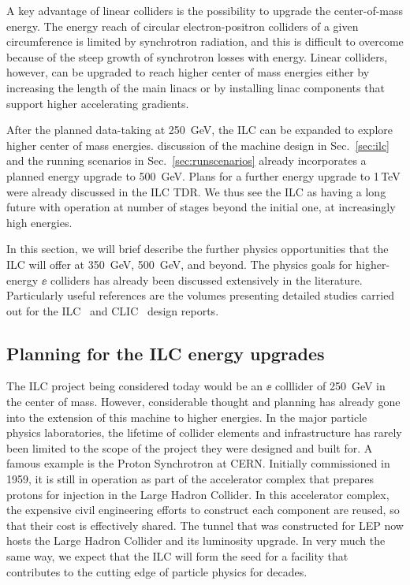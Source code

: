 


A key advantage of linear colliders is the possibility to upgrade
the center-of-mass energy.  The energy reach of circular electron-positron
colliders of a given circumference is limited by synchrotron
radiation, and this is difficult to overcome because of the steep
growth of synchrotron losses with energy.  Linear colliders, however,
can be upgraded to reach higher center of mass energies either by
increasing the length of the main linacs or by installing linac components
that support higher accelerating gradients.  

After the planned data-taking at 250~GeV, the ILC can
be expanded to explore higher center of mass energies.
discussion of the machine design in Sec.~\ref{sec:ilc} and the 
running scenarios in Sec.~\ref{sec:runscenarios} already incorporates a 
planned energy upgrade to 500~GeV.  Plans for a further energy upgrade
to 1\,TeV were already discussed in the ILC TDR.
  We thus see the ILC as having a long
future with operation at number of stages beyond the initial one, at
increasingly high energies. 

In this section, we will brief describe the further physics
opportunities that the ILC will offer at 350~GeV, 500~GeV, and beyond.
The physics goals for higher-energy $\ee$ colliders has already been 
discussed extensively in the literature. Particularly useful
references are the volumes presenting  detailed studies carried out for 
the ILC~\cite{Fujii:2015jha,Baer:2013cma}
and CLIC~\cite{Linssen:2012hp,deBlas:2018mhx,Roloff:2018dqu} design reports. 




\subsection{Planning for the ILC energy upgrades}
\label{subsec:highE:tech}

The ILC project  being considered today would be an $\ee$ colllider of
250~GeV in the center of mass.  However, considerable thought and
planning has already gone into the extension of this machine to higher energies.
In the major particle physics laboratories, the lifetime of collider elements
and infrastructure has rarely been  limited to the scope of the project they were
designed and built for. A famous example is the Proton Synchrotron at CERN.
Initially commissioned in 1959, it is still in operation as
part of the accelerator complex that prepares protons for injection in the
Large Hadron Collider. In this accelerator complex, the  expensive civil engineering
efforts to construct each component are reused, so that their cost is effectively shared. The tunnel
that was constructed for LEP now hosts the Large Hadron Collider and its
luminosity upgrade. In very much the same way, we
expect  that the ILC will  form the seed for a facility that contributes to the
cutting edge of particle physics for decades.


